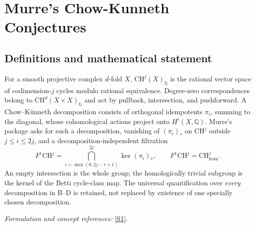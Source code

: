 \documentclass[11pt]{article}
\newcommand{\Q}{\mathbb{Q}}
\newcommand{\sref}[2]{\hyperlink{source:#1:#2}{[S#2]}}
\newif\ifshowcatalogue
\newcommand{\cataloguescope}[1]{\ifshowcatalogue
 \paragraph{Exact scope in the supplied catalogue.}
 \begin{quote}\small #1\end{quote}\fi}
\begin{document}
\setcounter{section}{152}
\clearpage
\section{\texorpdfstring{Murre's Chow-Kunneth Conjectures}{Murre's Chow-Kunneth Conjectures}}\label{153}
\subsection{Definitions and mathematical statement}
For a smooth projective complex $d$-fold $X$, $\mathrm{CH}^j(X)_{\Q}$ is the rational vector space of codimension-$j$ cycles modulo rational equivalence. Degree-zero correspondences belong to $\mathrm{CH}^d(X\times X)_{\Q}$ and act by pullback, intersection, and pushforward. A Chow--K\"unneth decomposition consists of orthogonal idempotents $\pi_i$, summing to the diagonal, whose cohomological actions project onto $H^i(X,\Q)$. Murre's package asks for such a decomposition, vanishing of $(\pi_i)_*$ on $\mathrm{CH}^j$ outside $j\le i\le2j$, and a decomposition-independent filtration
\[
 F^r\mathrm{CH}^j=\bigcap_{i=\max(0,2j-r+1)}^{2j}\ker(\pi_i)_*,
 \qquad F^1\mathrm{CH}^j=\mathrm{CH}^j_{\mathrm{hom}}.
\]
An empty intersection is the whole group; the homologically trivial subgroup is the kernel of the Betti cycle-class map. The universal quantification over \emph{every} decomposition in B--D is retained, not replaced by existence of one specially chosen decomposition.
\par\smallskip\textit{Formulation and concept references:} \sref{153}{1}.
\cataloguescope{For every smooth projective irreducible complex variety X of dimension d, let CH\textasciicircum{}j(X)\_Q denote cycles modulo rational equivalence, with Betti Q-cohomology. A correspondence pi in CH\textasciicircum{}d(X x X)\_Q acts by pi\_*(a)=(p\_2)\_*(p\_1\textasciicircum{}*(a).pi). Murre's full A-D package asserts: (A) there exists a Chow-Kunneth decomposition, namely mutually orthogonal composition-idempotents pi\_0,...,pi\_(2d) in CH\textasciicircum{}d(X x X)\_Q summing to the diagonal and inducing projection onto H\textasciicircum{}i(X,Q) for pi\_i; (B) for EVERY such decomposition and 0<=j<=d, pi\_i acts as zero on CH\textasciicircum{}j when i<j or i>2j; (C) for EVERY such decomposition define F\textasciicircum{}r CH\textasciicircum{}j as the intersection of ker(pi\_i)\_* for max(0,2j-r+1)<=i<=2j, r>=0, with empty intersection F\textasciicircum{}0=CH\textasciicircum{}j; these filtrations are equal for ALL decompositions satisfying A; (D) for EVERY such decomposition, F\textasciicircum{}1 CH\textasciicircum{}j equals ker(CH\textasciicircum{}j(X)\_Q -> H\textasciicircum{}(2j)(X,Q)). Under A and B, F\textasciicircum{}(j+1)=0. No multiplicative or self-dual decomposition, explicit construction algorithm, functorial-extra requirement, or arbitrary-base-field enlargement is included.}
\end{document}
